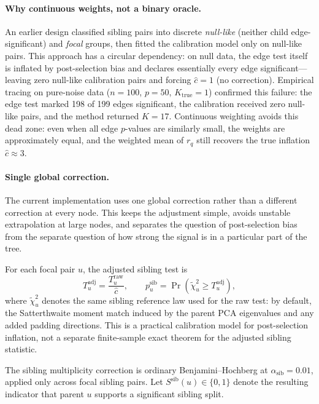 \paragraph{Why continuous weights, not a binary oracle.}
An earlier design classified sibling pairs into discrete \emph{null-like}
(neither child edge-significant) and \emph{focal} groups, then fitted the
calibration model only on null-like pairs.  This approach has a circular
dependency: on null data, the edge test itself is inflated by post-selection
bias and declares essentially every edge significant---leaving zero null-like
calibration pairs and forcing $\hat{c}=1$ (no correction).  Empirical tracing
on pure-noise data ($n=100$, $p=50$, $K_{\mathrm{true}}=1$) confirmed this
failure: the edge test marked 198 of 199 edges significant, the calibration
received zero null-like pairs, and the method returned $K=17$. Continuous
weighting avoids this dead zone: even when all edge $p$-values are similarly
small, the weights are approximately equal, and the weighted mean of $r_q$
still recovers the true inflation $\hat{c} \approx 3$.

\paragraph{Single global correction.}
The current implementation uses one global correction rather than a different
correction at every node. This keeps the adjustment simple, avoids unstable
extrapolation at large nodes, and separates the question of post-selection bias
from the separate question of how strong the signal is in a particular part of
the tree.

For each focal pair $u$, the adjusted sibling test is
\begin{equation}
T_u^{\mathrm{adj}} = \frac{T_u^{\mathrm{raw}}}{\hat{c}},
\qquad
p_u^{\mathrm{sib}}
=
\Pr\!\left(\widetilde{\chi}^2_u \ge T_u^{\mathrm{adj}}\right),
\end{equation}
where $\widetilde{\chi}^2_u$ denotes the same sibling reference law used for the
raw test: by default, the Satterthwaite moment match induced by the parent PCA
eigenvalues and any added padding directions.
This is a practical calibration model for post-selection inflation, not a
separate finite-sample exact theorem for the adjusted sibling statistic.

The sibling multiplicity correction is ordinary
Benjamini--Hochberg \citep{benjamini1995controlling} at
$\alpha_{\mathrm{sib}} = 0.01$, applied only across focal sibling pairs. Let
$S^{\mathrm{sib}}(u) \in \{0,1\}$ denote the resulting indicator that parent
$u$ supports a significant sibling split.

